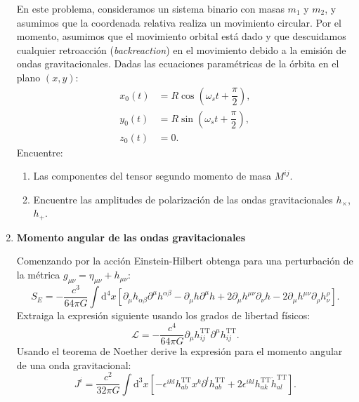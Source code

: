 \documentclass[../main]{subfiles}
\begin{document}
\begin{enumerate}
    En este problema, consideramos un sistema binario con masas $m_1$ y $m_2$, y asumimos que la coordenada relativa realiza un movimiento circular. Por el momento, asumimos que el movimiento orbital está dado y que descuidamos cualquier retroacción (\textit{backreaction}) en el movimiento debido a la emisión de ondas gravitacionales. Dadas las ecuaciones paramétricas de la órbita en el plano $(x, y)$:
    \begin{equation}
        \begin{split}
            x_0(t)&=R \cos\left(\omega_s t+\dfrac{\pi}{2}\right),\\
            y_0(t)&=R \sin\left(\omega_s t+\dfrac{\pi}{2}\right),\\
            z_0(t)&=0.
        \end{split}
    \end{equation}
    Encuentre:
    \begin{enumerate}[label=(\alph*)]
        \item Las componentes del tensor segundo momento de masa $M^{ij}$.
        \item Encuentre las amplitudes de polarización de las ondas gravitacionales $h_{\times}$, $h_{+}$.
    \end{enumerate}
    \item \textbf{Momento angular de las ondas gravitacionales}
    
    Comenzando por la acción Einstein-Hilbert obtenga para una perturbación de la métrica $g_{\mu\nu}=\eta_{\mu\nu}+h_{\mu\nu}$:
    \begin{equation}
        S_E=-\dfrac{c^3}{64\pi G} \int \mathrm{d}^4 x\left[\partial_{\mu}h_{\alpha\beta}\partial^{\mu}h^{\alpha\beta}-\partial_{\mu}h \partial^{\mu}h+2\partial_{\mu}h^{\mu\nu}\partial_{\nu}h-2\partial_{\mu}h^{\mu\nu}\partial_{\rho}h^{\rho}_{\nu}\right].
    \end{equation}
    Extraiga la expresión siguiente usando los grados de libertad físicos:
    \begin{equation}
        \mathcal{L}=-\dfrac{c^4}{64\pi G}\partial_{\mu}h^{\mathrm{TT}}_{ij}\partial^{\mu}h^{\mathrm{TT}}_{ij}.
    \end{equation}
    Usando el teorema de Noether derive la expresión para el momento angular de una onda gravitacional:
    \begin{equation}
        J^{i}=\dfrac{c^2}{32\pi G}\int \mathrm{d}^3 x\left[-\epsilon^{ikl}h^{\mathrm{TT}}_{ab}x^k \partial^{l}h^{\mathrm{TT}}_{ab}+2\epsilon^{ikl}h^{\mathrm{TT}}_{ak}\dot{h}^{\mathrm{TT}}_{al}\right].
    \end{equation}
\end{enumerate}
\end{document}
